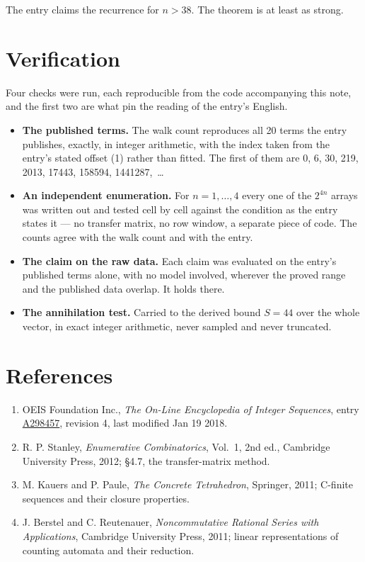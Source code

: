 \documentclass[11pt]{article}
\theoremstyle{definition}
\begin{document}
The entry claims the recurrence for $n > 38$. The theorem is at least as strong.

\section{Verification}

Four checks were run, each reproducible from the code accompanying this note, and the first two are what pin the reading of the entry's English.

\begin{itemize}

\item {\bfseries The published terms.} The walk count reproduces all 20 terms the entry publishes, exactly, in integer arithmetic, with the index taken from the entry's stated offset (1) rather than fitted. The first of them are 0, 6, 30, 219, 2013, 17443, 158594, 1441287,~\dots

\item {\bfseries An independent enumeration.} For $n = 1,\dots,4$ every one of the $2^{4n}$ arrays was written out and tested cell by cell against the condition as the entry states it --- no transfer matrix, no row window, a separate piece of code. The counts agree with the walk count and with the entry.

\item {\bfseries The claim on the raw data.} Each claim was evaluated on the entry's published terms alone, with no model involved, wherever the proved range and the published data overlap. It holds there.

\item {\bfseries The annihilation test.} Carried to the derived bound $S = 44$ over the whole vector, in exact integer arithmetic, never sampled and never truncated.

\end{itemize}

\section{References}

\begin{enumerate}

\item OEIS Foundation Inc., \emph{The On-Line Encyclopedia of Integer Sequences}, entry \href{https://oeis.org/A298457}{A298457}, revision 4, last modified Jan 19 2018.

\item R. P. Stanley, \emph{Enumerative Combinatorics}, Vol.~1, 2nd ed., Cambridge University Press, 2012; \S4.7, the transfer-matrix method.

\item M. Kauers and P. Paule, \emph{The Concrete Tetrahedron}, Springer, 2011; C-finite sequences and their closure properties.

\item J. Berstel and C. Reutenauer, \emph{Noncommutative Rational Series with Applications}, Cambridge University Press, 2011; linear representations of counting automata and their reduction.

\end{enumerate}
\end{document}
